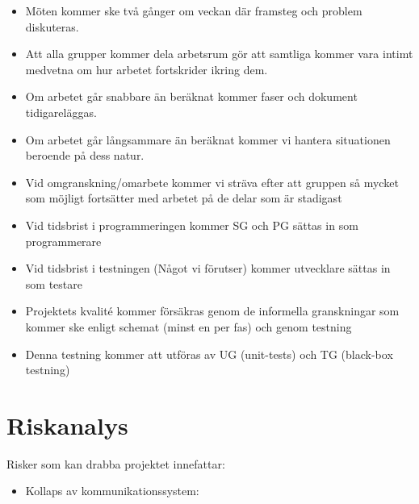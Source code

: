 \documentclass[paper=a4, fontsize=11pt,twoside]{article}
\begin{document}
\begin{itemize}
\item Möten kommer ske två gånger om veckan där framsteg och problem diskuteras.
\item Att alla grupper kommer dela arbetsrum gör att samtliga kommer vara intimt medvetna om hur arbetet fortskrider ikring dem.
\item Om arbetet går snabbare än beräknat kommer faser och dokument tidigareläggas.
\item Om arbetet går långsammare än beräknat kommer vi hantera situationen beroende på dess natur.
\item Vid omgranskning/omarbete kommer vi sträva efter att gruppen så mycket som möjligt fortsätter med arbetet på de delar som är stadigast
\item Vid tidsbrist i programmeringen kommer SG och PG sättas in som programmerare
\item Vid tidsbrist i testningen (Något vi förutser) kommer utvecklare sättas in som testare
\item Projektets kvalité kommer försäkras genom de informella granskningar som kommer ske enligt schemat (minst en per fas) och genom testning
\item Denna testning kommer att utföras av UG (unit-tests) och TG (black-box testning)
\end{itemize}

\section{Riskanalys}

Risker som kan drabba projektet innefattar: 
\begin{itemize}
\item Kollaps av kommunikationssystem: {\color{red}{Vill diskutera}}
\end{itemize}
\end{document}
